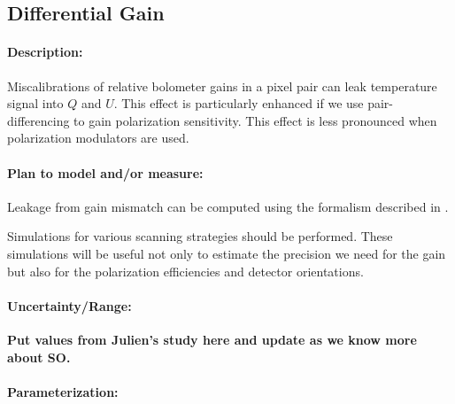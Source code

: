 \subsection{Differential Gain}

\paragraph{Description:}
Miscalibrations of relative bolometer gains in a pixel pair can leak temperature signal into $Q$ and $U$. This effect is particularly enhanced if we use pair-differencing to gain polarization sensitivity. This effect is less pronounced when polarization modulators are used.

\paragraph{Plan to model and/or measure:}
Leakage from gain mismatch can be computed using the formalism described in \cite{rosset2010}.

Simulations for various scanning strategies should be performed. These simulations will be useful not only to estimate the precision we need for the gain but also for the polarization efficiencies and detector orientations.



\paragraph{Uncertainty/Range:}

\textbf{Put values from Julien's study here and update as we know more about SO.}

\paragraph{Parameterization:}
